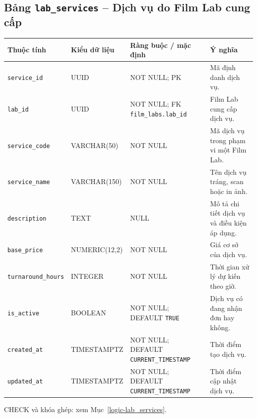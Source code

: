\subsection{Bảng \texttt{lab\_\allowbreak{}services} -- Dịch vụ do Film Lab cung cấp}
\label{dictionary-lab_services}
\begingroup
\footnotesize
\setlength{\tabcolsep}{3pt}
\begin{longtable}{>{\raggedright\arraybackslash}p{3.1cm}>{\raggedright\arraybackslash}p{2.5cm}>{\raggedright\arraybackslash}p{3.7cm}>{\raggedright\arraybackslash}p{4.3cm}}
\toprule
Thuộc tính & Kiểu dữ liệu & Ràng buộc / mặc định & Ý nghĩa \\
\midrule
\endhead
\texttt{service\_\allowbreak{}id} & UUID & NOT NULL; PK & Mã định danh dịch vụ. \\
\texttt{lab\_\allowbreak{}id} & UUID & NOT NULL; FK \texttt{film\_\allowbreak{}labs.lab\_\allowbreak{}id} & Film Lab cung cấp dịch vụ. \\
\texttt{service\_\allowbreak{}code} & VARCHAR(50) & NOT NULL & Mã dịch vụ trong phạm vi một Film Lab. \\
\texttt{service\_\allowbreak{}name} & VARCHAR(150) & NOT NULL & Tên dịch vụ tráng, scan hoặc in ảnh. \\
\texttt{description} & TEXT & NULL & Mô tả chi tiết dịch vụ và điều kiện áp dụng. \\
\texttt{base\_\allowbreak{}price} & NUMERIC(12,2) & NOT NULL & Giá cơ sở của dịch vụ. \\
\texttt{turnaround\_\allowbreak{}hours} & INTEGER & NOT NULL & Thời gian xử lý dự kiến theo giờ. \\
\texttt{is\_\allowbreak{}active} & BOOLEAN & NOT NULL; DEFAULT \texttt{TRUE} & Dịch vụ có đang nhận đơn hay không. \\
\texttt{created\_\allowbreak{}at} & TIMESTAMPTZ & NOT NULL; DEFAULT \texttt{CURRENT\_\allowbreak{}TIMESTAMP} & Thời điểm tạo dịch vụ. \\
\texttt{updated\_\allowbreak{}at} & TIMESTAMPTZ & NOT NULL; DEFAULT \texttt{CURRENT\_\allowbreak{}TIMESTAMP} & Thời điểm cập nhật dịch vụ. \\
\bottomrule
\end{longtable}
\endgroup
CHECK và khóa ghép: xem Mục~\ref{logic-lab_services}.
